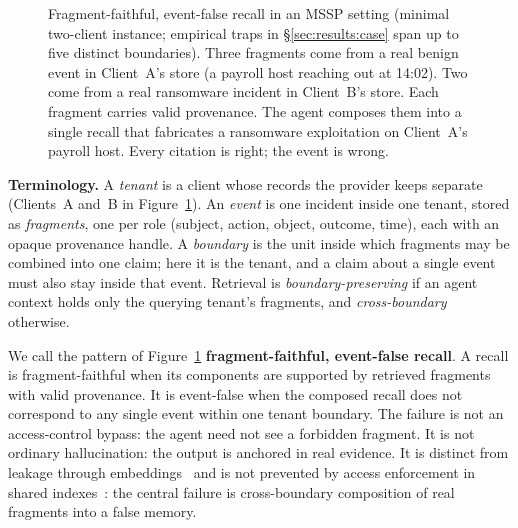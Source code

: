 \documentclass[conference,compsoc]{IEEEtran}
\begin{document}
\begin{figure}[t]
\caption{Fragment-faithful, event-false recall in an MSSP setting (minimal two-client instance; empirical traps in \S\ref{sec:results:case} span up to five distinct boundaries). Three fragments come from a real benign event in Client~A's store (a payroll host reaching out at 14:02). Two come from a real ransomware incident in Client~B's store. Each fragment carries valid provenance. The agent composes them into a single recall that fabricates a ransomware exploitation on Client~A's payroll host. Every citation is right; the event is wrong.}
\label{fig:overview}
\end{figure}

\textbf{Terminology.} A \emph{tenant} is a client whose records the provider keeps separate (Clients~A and~B in Figure~\ref{fig:overview}). An \emph{event} is one incident inside one tenant, stored as \emph{fragments}, one per role (subject, action, object, outcome, time), each with an opaque provenance handle. A \emph{boundary} is the unit inside which fragments may be combined into one claim; here it is the tenant, and a claim about a single event must also stay inside that event. Retrieval is \emph{boundary-preserving} if an agent context holds only the querying tenant's fragments, and \emph{cross-boundary} otherwise.

We call the pattern of Figure~\ref{fig:overview} \textbf{fragment-faithful, event-false recall}. A recall is fragment-faithful when its components are supported by retrieved fragments with valid provenance. It is event-false when the composed recall does not correspond to any single event within one tenant boundary. The failure is not an access-control bypass: the agent need not see a forbidden fragment. It is not ordinary hallucination: the output is anchored in real evidence. It is distinct from leakage through embeddings~\cite{song2020embeddingleakage} and is not prevented by access enforcement in shared indexes~\cite{jin2024curator}: the central failure is cross-boundary composition of real fragments into a false memory.
\end{document}
